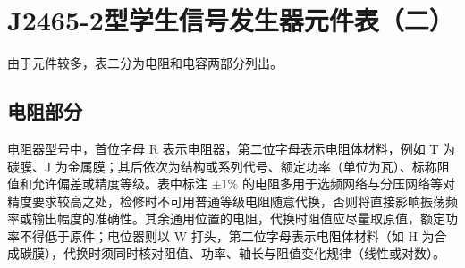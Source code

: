 \documentclass[12pt,UTF8]{ctexbook}
\begin{document}
	\section{J2465-2型学生信号发生器元件表（二）}
	由于元件较多，表二分为电阻和电容两部分列出。
	
	\subsection{电阻部分}
	
	电阻器型号中，首位字母 R 表示电阻器，第二位字母表示电阻体材料，例如 T 为碳膜、J 为金属膜；其后依次为结构或系列代号、额定功率（单位为瓦）、标称阻值和允许偏差或精度等级。表中标注 $\pm 1\%$ 的电阻多用于选频网络与分压网络等对精度要求较高之处，检修时不可用普通等级电阻随意代换，否则将直接影响振荡频率或输出幅度的准确性。其余通用位置的电阻，代换时阻值应尽量取原值，额定功率不得低于原件；电位器则以 W 打头，第二位字母表示电阻体材料（如 H 为合成碳膜），代换时须同时核对阻值、功率、轴长与阻值变化规律（线性或对数）。
	
\end{document}

